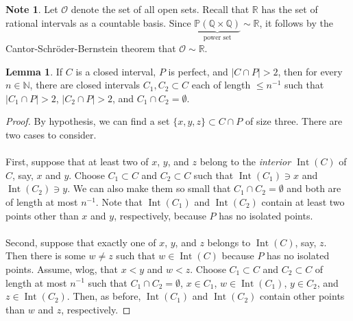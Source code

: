 \documentclass[10pt,letterpaper,cm]{nupset}
\theoremstyle{definition}
\newtheorem{note}[definition]{Note}
\theoremstyle{theorem}
\newtheorem{lemma}[definition]{Lemma}
\theoremstyle{remark}
\newcommand{\N}{\mathbb N}
\renewcommand{\P}{\mathbb P}
\newcommand{\Q}{\mathbb Q}
\newcommand{\R}{\mathbb R}
\newcommand{\1}{\mathbf{1}}
\newcommand{\0}{\vec 0}
\DeclareMathOperator{\Int}{Int}
\begin{document}
\begin{note}
 Let $\mathcal{O}$ denote the set of all open sets. Recall that $\R$ has the set of rational intervals as a countable basis. Since $ \underbrace{\P(\Q \times \Q)}_{\text{power set}} \sim \R$, it follows by  the Cantor-Schr\"oder-Bernstein theorem that  $\mathcal{O} \sim \R$.
\end{note}

\begin{lemma}\label{PL''}
If $C$ is a closed interval, $P$ is perfect, and $\lvert{C \cap P}\rvert >  2$, then for every $n \in \N$, there are closed intervals $C_1, C_2 \subset C$ each of length $\leq n^{-1}$ such that $\lvert{C_1 \cap P}\rvert > 2$, $\lvert{C_2 \cap P}\rvert > 2$, and $C_1 \cap C_2 =\emptyset$.
\end{lemma}
\begin{proof}
By hypothesis, we can find a set $\{x,y, z\} \subset C \cap P$ of size three. There are two cases to consider. 
\\ \\First, suppose that at least two of $x$, $y$, and $z$ belong to the \textit{interior $\Int(C)$} of $C$, say, $x$ and $y$. Choose $C_1\subset C$ and $C_2 \subset C$ such that  $\Int(C_1) \ni x $ and $\Int(C_2) \ni y$. We can also make them so small that $C_1 \cap C_2 =\emptyset$ and both are of length at most $n^{-1}$. Note that $\Int(C_1)$ and $\Int(C_2)$ contain at least two points other than $x$ and $y$, respectively, because $P$ has no isolated points. 
\\ \\
Second, suppose that exactly one of $x$, $y$, and $z$ belongs to $\Int(C)$, say, $z$. Then there is some $w \ne z$ such that $w\in \Int(C)$ because $P$ has no isolated points. Assume, wlog, that $x<y$ and $w<z$. Choose $C_1\subset C$ and $C_2 \subset C$ of length at most $n^{-1}$ such that $C_1\cap C_2 = \emptyset$, $x\in C_1$, $w\in \Int(C_1)$, $y\in C_2$, and $z\in \Int(C_2)$. Then, as before, $\Int(C_1)$ and $\Int(C_2)$ contain other points than $w$ and $z$, respectively. 
\end{proof}
\end{document}
